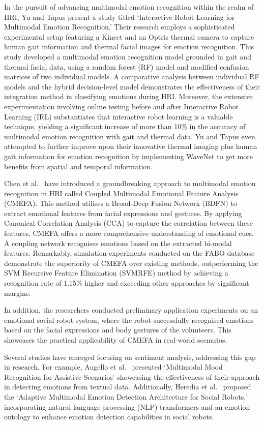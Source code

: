 In the pursuit of advancing multimodal emotion recognition within the realm of HRI, Yu and Tapus \cite{Yu2019-ku} present a study titled `Interactive Robot Learning for Multimodal Emotion Recognition.' Their research employs a sophisticated experimental setup featuring a Kinect and an Optris thermal camera to capture human gait information and thermal facial images for emotion recognition. This study developed a multimodal emotion recognition model grounded in gait and thermal facial data, using a random forest (RF) model and modified confusion matrices of two individual models. A comparative analysis between individual RF models and the hybrid decision-level model demonstrates the effectiveness of their integration method in classifying emotions during HRI. Moreover, the extensive experimentation involving online testing before and after Interactive Robot Learning (IRL) substantiates that interactive robot learning is a valuable technique, yielding a significant increase of more than 10\% in the accuracy of multimodal emotion recognition with gait and thermal data. Yu and Tapus \cite{Yu2020-zq} even attempted to further improve upon their innovative thermal imaging plus human gait information for emotion recognition by implementing WaveNet to get more benefits from spatial and temporal information.

Chen et al.\ \cite{Chen2023-ss} have introduced a groundbreaking approach to multimodal emotion recognition in HRI called Coupled Multimodal Emotional Feature Analysis (CMEFA). This method utilises a Broad-Deep Fusion Network (BDFN) to extract emotional features from facial expressions and gestures. By applying Canonical Correlation Analysis (CCA) to capture the correlation between these features, CMEFA offers a more comprehensive understanding of emotional cues. A coupling network recognises emotions based on the extracted bi-modal features. Remarkably, simulation experiments conducted on the FABO database demonstrate the superiority of CMEFA over existing methods, outperforming the SVM Recursive Feature Elimination (SVMRFE) method by achieving a recognition rate of 1.15\% higher and exceeding other approaches by significant margins.

In addition, the researchers conducted preliminary application experiments on an emotional social robot system, where the robot successfully recognised emotions based on the facial expressions and body gestures of the volunteers. This showcases the practical applicability of CMEFA in real-world scenarios.

Several studies have emerged focusing on sentiment analysis, addressing this gap in research. For example, Augello et al.\ \cite{Augello2022-zy} presented `Multimodal Mood Recognition for Assistive Scenarios' showcasing the effectiveness of their approach in detecting emotions from textual data. Additionally, Heredia et al.\ \cite{Heredia2022-dt} proposed the `Adaptive Multimodal Emotion Detection Architecture for Social Robots,' incorporating natural language processing (NLP) transformers and an emotion ontology to enhance emotion detection capabilities in social robots.

